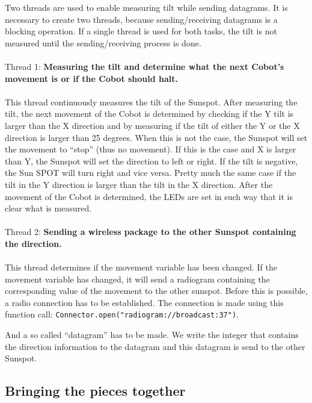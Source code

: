 \documentclass[a4paper,10pt]{article} %
\begin{document}
Two threads are used to enable measuring tilt while sending datagrams. It is
necessary to create two threads, because sending/receiving datagrams is a
blocking operation. If a single thread is used for both tasks, the tilt is not
measured until the sending/receiving process is done.
\\
\\
\noindent Thread 1: \textbf{Measuring the tilt and determine what the next
Cobot's movement is or if the Cobot should halt.}
\\
\\
This thread continuously measures the tilt of the Sunspot. After measuring the
tilt, the next movement of the Cobot is determined by checking if the Y tilt is
larger than the X direction and by measuring if the tilt of either the Y or the
X direction is larger than 25 degrees. When this is not the case, the Sunspot
will set the movement to ``stop'' (thus no movement). If this is the case and X
is larger than Y, the Sunspot will set the direction to left or right. If the
tilt is negative, the Sun SPOT will turn right and vice versa.  Pretty much the
same case if the tilt in the Y direction is larger than the tilt in the X
direction. After the movement of the Cobot is determined, the LEDs are set in
such way that it is clear what is measured.
\\
\\
\noindent Thread 2: \textbf{Sending a wireless package to the other Sunspot
containing the direction.}
\\
\\
This thread determines if the movement variable has been changed. If the
movement variable has changed, it will send a radiogram containing the
corresponding value of the movement to the other sunspot. Before this is
possible, a radio connection has to be established. The connection is made using
this function call: \texttt{Connector.open("radiogram://broadcast:37")}.

And a so called ``datagram'' has to be made. We write the integer that contains
the direction information to the datagram and this datagram is send to the other
Sunspot.



\subsection{Bringing the pieces together} %
\label{subsec:Bringing the pieces together}
\end{document}
